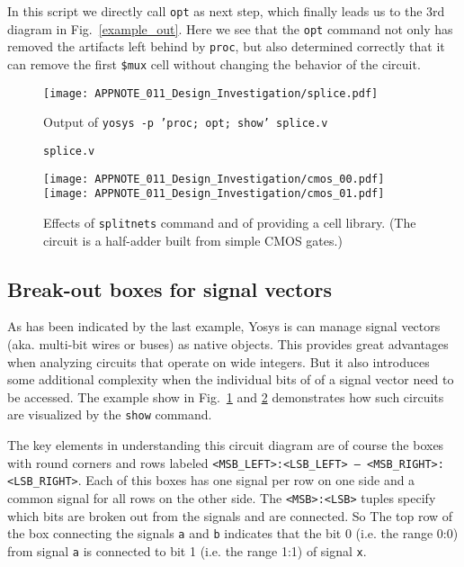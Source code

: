 \documentclass[9pt,technote,a4paper]{IEEEtran}
\begin{document}
\medskip

In this script we directly call {\tt opt} as next step, which finally leads us to
the 3rd diagram in Fig.~\ref{example_out}. Here we see that the {\tt opt} command
not only has removed the artifacts left behind by {\tt proc}, but also determined
correctly that it can remove the first {\tt \$mux} cell without changing the behavior
of the circuit.

\begin{figure}[b!]
\texttt{[image: APPNOTE\_011\_Design\_Investigation/splice.pdf]}
\caption{Output of {\tt yosys -p 'proc; opt; show' splice.v}}
\label{splice_dia}
\end{figure}

\begin{figure}[b!]

\caption{\tt splice.v}
\label{splice_src}
\end{figure}

\begin{figure}[t!]
\texttt{[image: APPNOTE\_011\_Design\_Investigation/cmos\_00.pdf]}
\texttt{[image: APPNOTE\_011\_Design\_Investigation/cmos\_01.pdf]}
\caption{Effects of {\tt splitnets} command and of providing a cell library. (The
circuit is a half-adder built from simple CMOS gates.)}
\label{splitnets_libfile}
\end{figure}

\subsection{Break-out boxes for signal vectors}

As has been indicated by the last example, Yosys is can manage signal vectors (aka.
multi-bit wires or buses) as native objects. This provides great advantages
when analyzing circuits that operate on wide integers. But it also introduces
some additional complexity when the individual bits of of a signal vector need
to be accessed. The example show in Fig.~\ref{splice_dia} and \ref{splice_src}
demonstrates how such circuits are visualized by the {\tt show} command.

The key elements in understanding this circuit diagram are of course the boxes
with round corners and rows labeled {\tt <MSB\_LEFT>:<LSB\_LEFT> -- <MSB\_RIGHT>:<LSB\_RIGHT>}.
Each of this boxes has one signal per row on one side and a common signal for all rows on the
other side. The {\tt <MSB>:<LSB>} tuples specify which bits are broken out from the signals
and are connected. So The top row of the box connecting the signals {\tt a} and {\tt b} indicates
that the bit 0 (i.e. the range 0:0) from signal {\tt a} is connected to bit 1 (i.e. the range
1:1) of signal {\tt x}.
\end{document}

